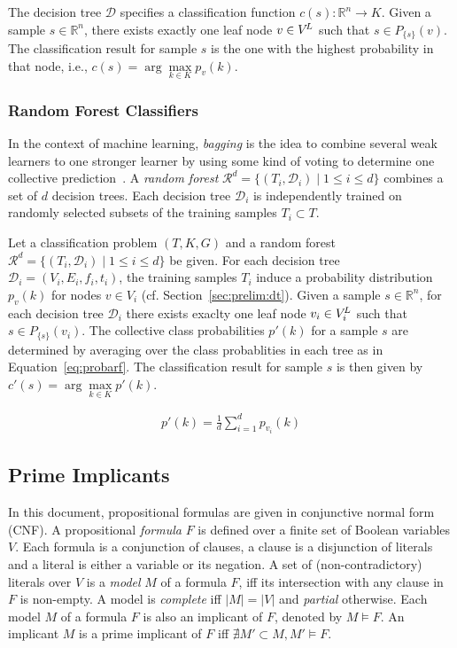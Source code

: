 \documentclass[a4paper, USenglish, cleveref, autoref, thm-restate]{lipics-v2021}
\theoremstyle{definition}
\begin{document}
The decision tree $\mathcal{D}$ specifies a classification function $c(s) : \mathbb{R}^n \rightarrow K$. 
Given a sample $s \in \mathbb{R}^n$, there exists exactly one leaf node $v \in V^{\!L}$ such that $s \in P_{\!\{\!s\!\}}(v)$. 
The classification result for sample $s$ is the one with the highest probability in that node, i.e., $c(s) = \arg\max\limits_{k \in K} p_v(k)$. 


\subsubsection{Random Forest Classifiers}
\label{sec:prelim:rf}

In the context of machine learning, \emph{bagging} is the idea to combine several weak learners to one stronger learner by using some kind of voting to determine one collective prediction~\cite{Hastie:2009}. 
A \emph{random forest} $\mathcal{R}^d = \{ (T_i, \mathcal{D}_i) \mid 1 \leq i \leq d \}$ combines a set of $d$ decision trees. 
Each decision tree $\mathcal{D}_i$ is independently trained on randomly selected subsets of the training samples $T_i \subset T$. 

Let a classification problem $(T, K, G)$ and a random forest $\mathcal{R}^d = \{ (T_i, \mathcal{D}_i) \mid 1 \leq i \leq d \}$ be given. 
For each decision tree $\mathcal{D}_i = (V_i, E_i, f_i, t_i)$, the training samples $T_i$ induce a probability distribution $p_v(k)$ for nodes $v \in V_i$ (cf. Section~\ref{sec:prelim:dt}). Given a sample $s \in \mathbb{R}^n$, for each decision tree $\mathcal{D}_i$ there exists exaclty one leaf node $v_i \in V^{\!L}_i$ such that $s \in P_{\!\{\!s\!\}}(v_i)$. 
The collective class probabilities $p'(k)$ for a sample $s$ are determined by averaging over the class probablities in each tree as in Equation~\ref{eq:probarf}. 
The classification result for sample $s$ is then given by $c'(s) = \arg\max\limits_{k \in K} p'(k)$. 

\begin{align}
\label{eq:probarf}
p'(k) = \frac{1}{d}\sum\limits_{i = 1}^d p_{v_i}(k)
\end{align}


\subsection{Prime Implicants}
\label{sec:prelim:pi}

In this document, propositional formulas are given in conjunctive normal form (CNF). 
A propositional \emph{formula} $F$ is defined over a finite set of Boolean variables $V$. 
Each formula is a conjunction of clauses, a clause is a disjunction of literals and a literal is either a variable or its negation.  
A set of (non-contradictory) literals over $V$ is a \emph{model} $M$ of a formula $F$, iff its intersection with any clause in $F$ is non-empty. 
A model is \emph{complete} iff $|M| = |V|$ and \emph{partial} otherwise. 
Each model $M$ of a formula $F$ is also an implicant of $F$, denoted by $M \models F$. 
An implicant $M$ is a prime implicant of $F$ iff $\nexists M' \subset M, M' \models F$. 
\end{document}
